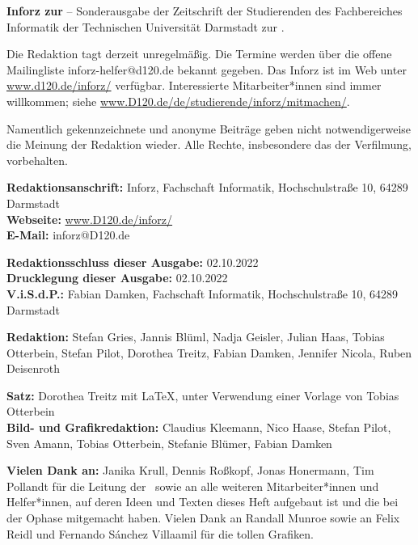 \small

\textbf{Inforz zur \ophase} – Sonderausgabe der Zeitschrift der Studierenden des Fachbereiches Informatik der Technischen Universität Darmstadt zur \ophase.

\vspace{3mm}
Die Redaktion tagt derzeit unregelmäßig. Die Termine werden über die offene Mailingliste inforz-helfer@d120.de bekannt gegeben. Das Inforz ist im Web unter \url{www.d120.de/inforz/} verfügbar. Interessierte Mitarbeiter*innen sind immer willkommen; siehe \url{www.D120.de/de/studierende/inforz/mitmachen/}.

\vspace{3mm}
Namentlich gekennzeichnete und anonyme Beiträge geben nicht notwendigerweise die Meinung der Redaktion wieder. Alle Rechte, insbesondere das der Verfilmung, vorbehalten.


\textbf{Redaktionsanschrift:} Inforz, Fachschaft Informatik, Hochschulstraße 10, 64289 Darmstadt\\
\textbf{Webseite:} \url{www.D120.de/inforz/}\\
\textbf{E-Mail:} inforz@D120.de

\vspace{3mm}
\textbf{Redaktionsschluss dieser Ausgabe:} 02.10.2022\\
\textbf{Drucklegung dieser Ausgabe:} 02.10.2022\\
\textbf{V.i.S.d.P.:} Fabian Damken, Fachschaft Informatik, Hochschulstraße 10, 64289 Darmstadt

\vspace{3mm}
\textbf{Redaktion:} Stefan Gries, Jannis Blüml, Nadja Geisler, Julian Haas, Tobias Otterbein, Stefan Pilot, Dorothea Treitz, Fabian Damken, Jennifer Nicola, Ruben Deisenroth

\vspace{3mm}
\textbf{Satz:} Dorothea Treitz mit \LaTeX, unter Verwendung einer Vorlage von Tobias Otterbein\\
\textbf{Bild- und Grafikredaktion:} Claudius Kleemann, Nico Haase, Stefan Pilot, Sven Amann, Tobias Otterbein, Stefanie Blümer, Fabian Damken

\vspace{3mm}
\textbf{Vielen Dank an:} Janika Krull, Dennis Roßkopf, Jonas Honermann, Tim Pollandt für die Leitung der \ophase \  sowie an alle weiteren Mitarbeiter*innen und Helfer*innen, auf deren Ideen und Texten dieses Heft aufgebaut ist und die bei der Ophase mitgemacht haben. Vielen Dank an Randall Munroe sowie an Felix Reidl und Fernando Sánchez Villaamil für die tollen Grafiken.\\

